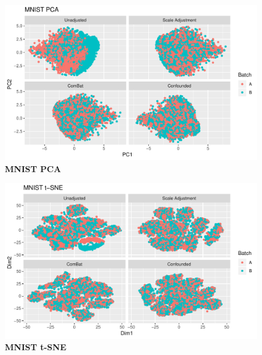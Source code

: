 \documentclass{article}
\begin{document}
\begin{figure}
	\centering
	\includegraphics[width=\columnwidth]{figures/supplement/mnist_pca.pdf}
	\caption{\textbf{MNIST PCA}
	}
	\label{fig:pca}
\end{figure}
\begin{figure}
	\centering
	\includegraphics[width=\columnwidth]{figures/supplement/mnist_tsne.pdf}
	\caption{\textbf{MNIST t-SNE}
	}
	\label{fig:tsne}
\end{figure}


\end{document}
